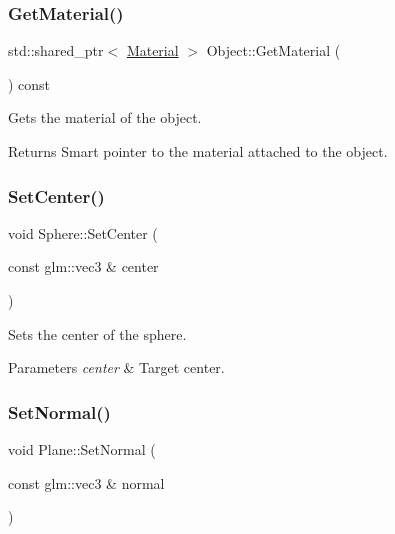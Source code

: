 \subsubsection{\texorpdfstring{Get\+Material()}{GetMaterial()}}
{\footnotesize\ttfamily std\+::shared\+\_\+ptr$<$ \hyperlink{class_material}{Material} $>$ Object\+::\+Get\+Material (\begin{DoxyParamCaption}{ }\end{DoxyParamCaption}) const\hspace{0.3cm}{\ttfamily [inline]}}

Gets the material of the object. \begin{DoxyReturn}{Returns}
Smart pointer to the material attached to the object. 
\end{DoxyReturn}
\hypertarget{group___geometric_objects_ga2b8aef309428ea904c75ce3300a71e09}{}\label{group___geometric_objects_ga2b8aef309428ea904c75ce3300a71e09} 
\subsubsection{\texorpdfstring{Set\+Center()}{SetCenter()}}
{\footnotesize\ttfamily void Sphere\+::\+Set\+Center (\begin{DoxyParamCaption}\item[{const glm\+::vec3 \&}]{center }\end{DoxyParamCaption})\hspace{0.3cm}{\ttfamily [inline]}}

Sets the center of the sphere. 
\begin{DoxyParams}{Parameters}
{\em center} & Target center. \\
\hline
\end{DoxyParams}
\hypertarget{group___geometric_objects_ga50e8800fa3595a6b6fafcda17a77388c}{}\label{group___geometric_objects_ga50e8800fa3595a6b6fafcda17a77388c} 
\subsubsection{\texorpdfstring{Set\+Normal()}{SetNormal()}}
{\footnotesize\ttfamily void Plane\+::\+Set\+Normal (\begin{DoxyParamCaption}\item[{const glm\+::vec3 \&}]{normal }\end{DoxyParamCaption})\hspace{0.3cm}{\ttfamily [inline]}}

